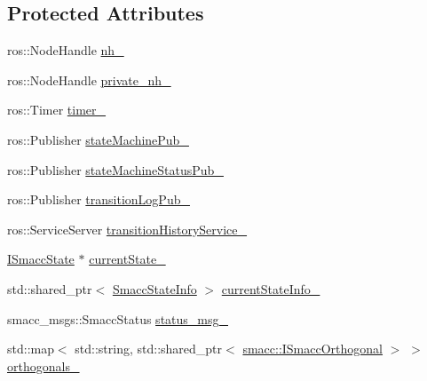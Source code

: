 \subsection*{Protected Attributes}
\begin{DoxyCompactItemize}
\item 
ros\+::\+Node\+Handle \hyperlink{classsmacc_1_1ISmaccStateMachine_ad8877bcca9dbb345fe72cca839c93dd3}{nh\+\_\+}
\item 
ros\+::\+Node\+Handle \hyperlink{classsmacc_1_1ISmaccStateMachine_a9c6a5c647ecca6599589c12fdcd53bfc}{private\+\_\+nh\+\_\+}
\item 
ros\+::\+Timer \hyperlink{classsmacc_1_1ISmaccStateMachine_ab6b00dc92aa86f1074d795fb4057e5bc}{timer\+\_\+}
\item 
ros\+::\+Publisher \hyperlink{classsmacc_1_1ISmaccStateMachine_af4aa9fed70bd4c57b19e3370fbd25de7}{state\+Machine\+Pub\+\_\+}
\item 
ros\+::\+Publisher \hyperlink{classsmacc_1_1ISmaccStateMachine_a55a7c7b26ad4dfea441c62c6326a5414}{state\+Machine\+Status\+Pub\+\_\+}
\item 
ros\+::\+Publisher \hyperlink{classsmacc_1_1ISmaccStateMachine_acc42eb050325c1edc77d81675fb1286a}{transition\+Log\+Pub\+\_\+}
\item 
ros\+::\+Service\+Server \hyperlink{classsmacc_1_1ISmaccStateMachine_a73e2a7ca89c3d807eafe5cfb1e86ea05}{transition\+History\+Service\+\_\+}
\item 
\hyperlink{classsmacc_1_1ISmaccState}{I\+Smacc\+State} $\ast$ \hyperlink{classsmacc_1_1ISmaccStateMachine_a9c6e7745205bcce80a301f2fbe8f7e99}{current\+State\+\_\+}
\item 
std\+::shared\+\_\+ptr$<$ \hyperlink{classsmacc_1_1introspection_1_1SmaccStateInfo}{Smacc\+State\+Info} $>$ \hyperlink{classsmacc_1_1ISmaccStateMachine_a95e42f735cecdc231ad5372bf9fe7eaf}{current\+State\+Info\+\_\+}
\item 
smacc\+\_\+msgs\+::\+Smacc\+Status \hyperlink{classsmacc_1_1ISmaccStateMachine_a4f47dd614f12a95e7a3c46d465ce4b13}{status\+\_\+msg\+\_\+}
\item 
std\+::map$<$ std\+::string, std\+::shared\+\_\+ptr$<$ \hyperlink{classsmacc_1_1ISmaccOrthogonal}{smacc\+::\+I\+Smacc\+Orthogonal} $>$ $>$ \hyperlink{classsmacc_1_1ISmaccStateMachine_acc5944f313bc6ce1637c632243a511f2}{orthogonals\+\_\+}
\end{DoxyCompactItemize}
